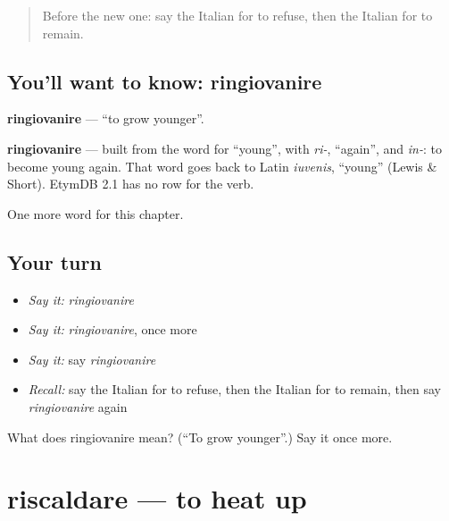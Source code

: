 \label{lesson:IT-C147-ringiovanire}



\begin{quote}
Before the new one: say the Italian for to refuse, then the Italian for to remain.
\end{quote}

\subsection*{You'll want to know: ringiovanire}
\textbf{ringiovanire} — \textquotedblleft{}to grow younger\textquotedblright{}.

\begin{cousinweb}
\textbf{ringiovanire} — built from the word for \textquotedblleft{}young\textquotedblright{}, with \emph{ri-}, \textquotedblleft{}again\textquotedblright{}, and \emph{in-}: to become young again. That word goes back to Latin \emph{iuvenis}, \textquotedblleft{}young\textquotedblright{} (Lewis \& Short). EtymDB 2.1 has no row for the verb.
\end{cousinweb}

\begin{grammarlens}[title={What you've built}]
One more word for this chapter.
\end{grammarlens}

\subsection*{Your turn}
\begin{itemize}
\raggedright
  \item \emph{Say it:} \emph{ringiovanire}
  \item \emph{Say it:} \emph{ringiovanire}, once more
  \item \emph{Say it:} say \emph{ringiovanire}
  \item \emph{Recall:} say the Italian for to refuse, then the Italian for to remain, then say \emph{ringiovanire} again
\end{itemize}

\begin{tcolorbox}[breakable,colback=teal!4,colframe=teal!35!black,title={Before you move on}]
What does ringiovanire mean? (\textquotedblleft{}To grow younger\textquotedblright{}.) Say it once more.
\end{tcolorbox}
\section[riscaldare]{riscaldare — to heat up}


